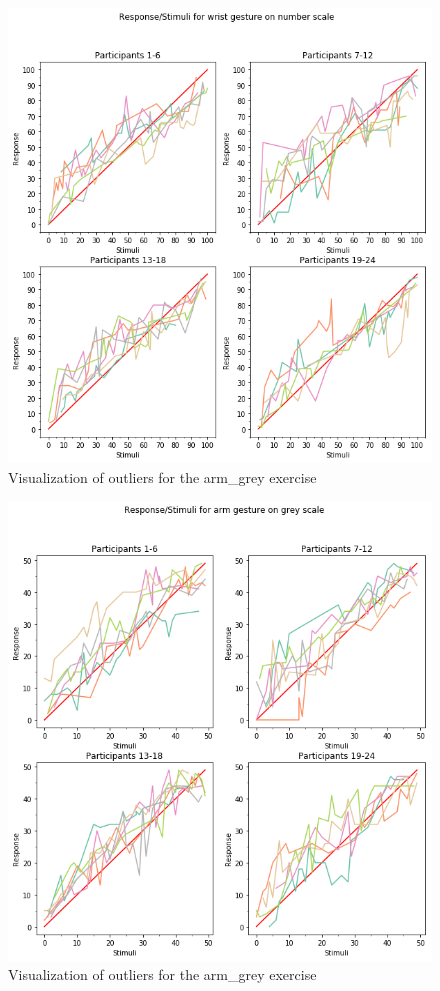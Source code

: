\begin{figure}[h!]
\centering
\includegraphics[width=1.1\textwidth]{figures/visual_out4.png}
\caption{Visualization of outliers for the arm\_grey exercise}
\label{NAN}
\end{figure}

\begin{figure}[h!]
\centering
\includegraphics[width=1.1\textwidth]{figures/visual_out5.png}
\caption{Visualization of outliers for the arm\_grey exercise}
\label{NAN}
\end{figure}

